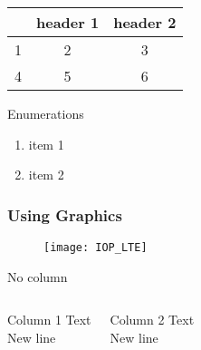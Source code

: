 \begin{frame}





  \begin{tabular}{|c|c|c|}
    \hline

    & \textbf{header 1} & \textbf{header 2} \\
    \hline    

    1 & 2 & 3 \\
    \hline

    4 & 5 & 6 \\
    \hline

  \end{tabular}

\end{frame}




\begin{frame}
Enumerations

\begin{enumerate}
  \item item 1

  \item item 2


\end{enumerate}



\end{frame}



\begin{frame}
  \frametitle{ Using Graphics }
  \begin{figure}
    \centering
    \texttt{[image: IOP\_LTE]}
  \end{figure}
\end{frame}



\begin{frame}
No column


  \begin{columns}[c]

    
    Column 1 Text \\
    New line
    

    
    Column 2 Text \\
    New line    

  \end{columns}



\end{frame}




